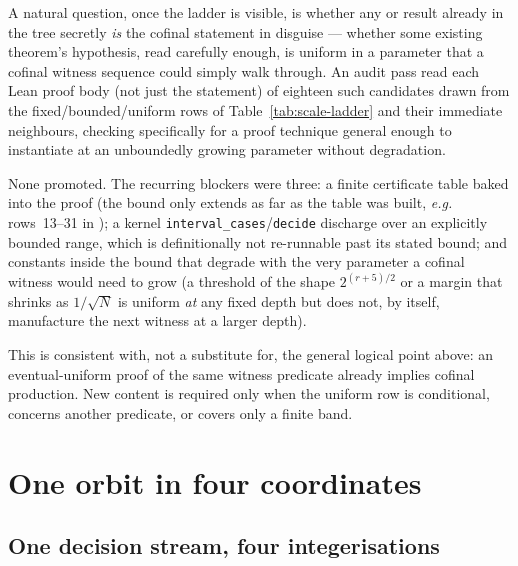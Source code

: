 \begin{rem}
\label{rem:promotion-audit}
A natural question, once the ladder is visible, is whether any  or 
result already in the tree secretly \emph{is} the cofinal statement in disguise — whether some
existing theorem's hypothesis, read carefully enough, is uniform in a parameter that a cofinal
witness sequence could simply walk through. An audit pass read each Lean proof body (not just the
statement) of eighteen such candidates drawn from the fixed/bounded/uniform rows of
Table~\ref{tab:scale-ladder} and their immediate neighbours, checking specifically for a proof
technique general enough to instantiate at an unboundedly growing parameter without degradation.

\par\medskip

None promoted. The recurring blockers were three: a finite certificate table baked into the proof
(the bound only extends as far as the table was built, \emph{e.g.} rows~13--31 in
);
a kernel \texttt{interval\_cases}/\texttt{decide} discharge over an explicitly bounded range, which
is definitionally not re-runnable past its stated bound; and constants inside the bound that
degrade with the very parameter a cofinal witness would need to grow (a threshold of the shape
$2^{(r+5)/2}$ or a margin that shrinks as $1/\sqrt N$ is uniform \emph{at} any fixed depth but does
not, by itself, manufacture the next witness at a larger depth).

\par\medskip

This is consistent with, not a substitute for, the general logical point above: an eventual-uniform proof of the same
witness predicate already implies cofinal production. New content is required only when the
uniform row is conditional, concerns another predicate, or covers only a finite band.
\end{rem}

\section{One orbit in four coordinates}
\label{sec:four-coordinates}

\subsection*{One decision stream, four integerisations}

